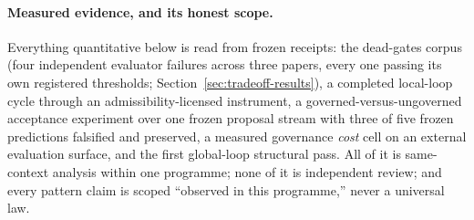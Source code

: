 \paragraph{Measured evidence, and its honest scope.}
Everything quantitative below is read from frozen receipts: the dead-gates corpus
(four independent evaluator failures across three papers, every one passing its own
registered thresholds; Section~\ref{sec:tradeoff-results}), a completed local-loop
cycle through an admissibility-licensed instrument, a governed-versus-ungoverned
acceptance experiment over one frozen proposal stream with three of five frozen
predictions falsified and preserved, a measured governance \emph{cost} cell on an
external evaluation surface, and the first global-loop structural pass. All of it is
same-context analysis within one programme; none of it is independent review; and
every pattern claim is scoped ``observed in this programme,'' never a universal law.
